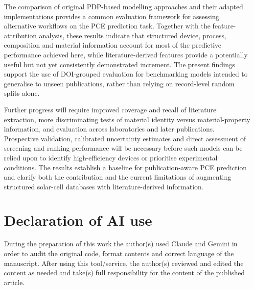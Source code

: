 \documentclass[3p]{elsarticle}
\begin{document}
The comparison of original PDP-based modelling approaches and their adapted implementations provides a common evaluation framework for assessing alternative workflows on the PCE prediction task. Together with the feature-attribution analysis, these results indicate that structured device, process, composition and material information account for most of the predictive performance achieved here, while literature-derived features provide a potentially useful but not yet consistently demonstrated increment. The present findings support the use of DOI-grouped evaluation for benchmarking models intended to generalise to unseen publications, rather than relying on record-level random splits alone.

Further progress will require improved coverage and recall of literature extraction, more discriminating tests of material identity versus material-property information, and evaluation across laboratories and later publications. Prospective validation, calibrated uncertainty estimates and direct assessment of screening and ranking performance will be necessary before such models can be relied upon to identify high-efficiency devices or prioritise experimental conditions. The results establish a baseline for publication-aware PCE prediction and clarify both the contribution and the current limitations of augmenting structured solar-cell databases with literature-derived information.

\section*{Declaration of AI use}
During the preparation of this work the author(s) used Claude and Gemini in order to audit the original code, format contents and correct language of the manuscript. After using this tool/service, the author(s) reviewed and edited the content as needed and take(s) full responsibility for the content of the published article.



\end{document}
